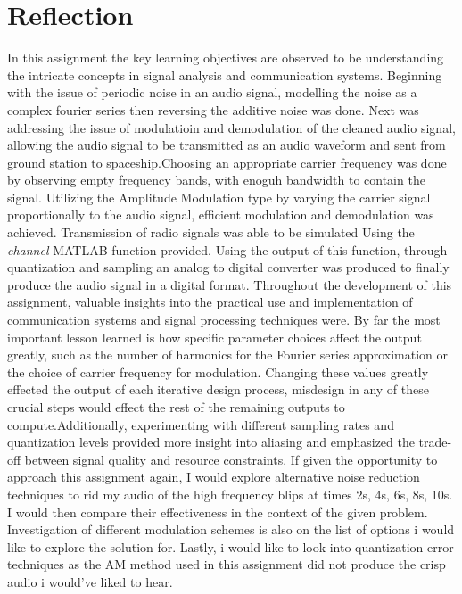 \documentclass{article}
\begin{document}
\section{Reflection}
In this assignment the key learning objectives are observed to be understanding the intricate concepts in signal analysis and communication systems. Beginning with the issue of periodic noise in an audio signal, modelling the noise as a complex fourier series then reversing the additive noise was done. Next was addressing the issue of modulatioin and demodulation of the cleaned audio signal, allowing the audio signal to be transmitted as an audio waveform and sent from ground station to spaceship.Choosing an appropriate carrier frequency was done by observing empty frequency bands, with enoguh bandwidth to contain the signal. Utilizing the Amplitude Modulation type by varying the carrier signal proportionally to the audio signal, efficient modulation and demodulation was achieved. Transmission of radio signals was able to be simulated Using the \textit{channel} MATLAB function provided. Using the output of this function, through quantization and sampling an analog to digital converter was produced to finally produce the audio signal in a digital format.
\bigbreak
Throughout the development of this assignment, valuable insights into the practical use and implementation of communication systems and signal processing techniques were. By far the most important lesson learned is how specific parameter choices affect the output greatly, such as the number of harmonics for the Fourier series approximation or the choice of carrier frequency for modulation. Changing these values greatly effected the output of each iterative design process, misdesign in any of these crucial steps would effect the rest of the remaining outputs to compute.Additionally, experimenting with different sampling rates and quantization levels provided more insight into aliasing and emphasized the trade-off between signal quality and resource constraints. If given the opportunity to approach this assignment again, I would explore alternative noise reduction techniques to rid my audio of the high frequency blips at times 2s, 4s, 6s, 8s, 10s. I would then compare their effectiveness in the context of the given problem. Investigation of different modulation schemes is also on the list of options i would like to explore the solution for. Lastly, i would like to look into quantization error techniques as the AM method used in this assignment did not produce the crisp audio i would've liked to hear.
\end{document}
